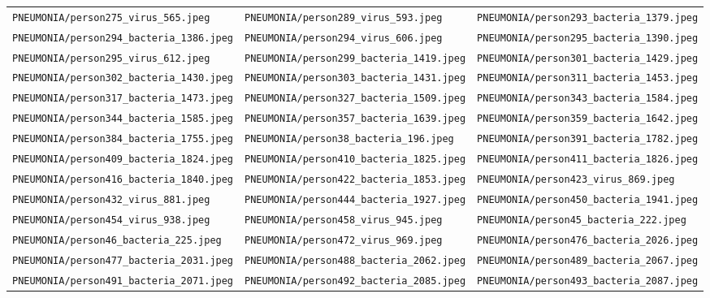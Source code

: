 \begin{center}
\begin{longtable}{lll}
\texttt{PNEUMONIA/person275\_virus\_565.jpeg} & \texttt{PNEUMONIA/person289\_virus\_593.jpeg} & \texttt{PNEUMONIA/person293\_bacteria\_1379.jpeg} \\
\texttt{PNEUMONIA/person294\_bacteria\_1386.jpeg} & \texttt{PNEUMONIA/person294\_virus\_606.jpeg} & \texttt{PNEUMONIA/person295\_bacteria\_1390.jpeg} \\
\texttt{PNEUMONIA/person295\_virus\_612.jpeg} & \texttt{PNEUMONIA/person299\_bacteria\_1419.jpeg} & \texttt{PNEUMONIA/person301\_bacteria\_1429.jpeg} \\
\texttt{PNEUMONIA/person302\_bacteria\_1430.jpeg} & \texttt{PNEUMONIA/person303\_bacteria\_1431.jpeg} & \texttt{PNEUMONIA/person311\_bacteria\_1453.jpeg} \\
\texttt{PNEUMONIA/person317\_bacteria\_1473.jpeg} & \texttt{PNEUMONIA/person327\_bacteria\_1509.jpeg} & \texttt{PNEUMONIA/person343\_bacteria\_1584.jpeg} \\
\texttt{PNEUMONIA/person344\_bacteria\_1585.jpeg} & \texttt{PNEUMONIA/person357\_bacteria\_1639.jpeg} & \texttt{PNEUMONIA/person359\_bacteria\_1642.jpeg} \\
\texttt{PNEUMONIA/person384\_bacteria\_1755.jpeg} & \texttt{PNEUMONIA/person38\_bacteria\_196.jpeg} & \texttt{PNEUMONIA/person391\_bacteria\_1782.jpeg} \\
\texttt{PNEUMONIA/person409\_bacteria\_1824.jpeg} & \texttt{PNEUMONIA/person410\_bacteria\_1825.jpeg} & \texttt{PNEUMONIA/person411\_bacteria\_1826.jpeg} \\
\texttt{PNEUMONIA/person416\_bacteria\_1840.jpeg} & \texttt{PNEUMONIA/person422\_bacteria\_1853.jpeg} & \texttt{PNEUMONIA/person423\_virus\_869.jpeg} \\
\texttt{PNEUMONIA/person432\_virus\_881.jpeg} & \texttt{PNEUMONIA/person444\_bacteria\_1927.jpeg} & \texttt{PNEUMONIA/person450\_bacteria\_1941.jpeg} \\
\texttt{PNEUMONIA/person454\_virus\_938.jpeg} & \texttt{PNEUMONIA/person458\_virus\_945.jpeg} & \texttt{PNEUMONIA/person45\_bacteria\_222.jpeg} \\
\texttt{PNEUMONIA/person46\_bacteria\_225.jpeg} & \texttt{PNEUMONIA/person472\_virus\_969.jpeg} & \texttt{PNEUMONIA/person476\_bacteria\_2026.jpeg} \\
\texttt{PNEUMONIA/person477\_bacteria\_2031.jpeg} & \texttt{PNEUMONIA/person488\_bacteria\_2062.jpeg} & \texttt{PNEUMONIA/person489\_bacteria\_2067.jpeg} \\
\texttt{PNEUMONIA/person491\_bacteria\_2071.jpeg} & \texttt{PNEUMONIA/person492\_bacteria\_2085.jpeg} & \texttt{PNEUMONIA/person493\_bacteria\_2087.jpeg} \\

\end{longtable}
\end{center}
